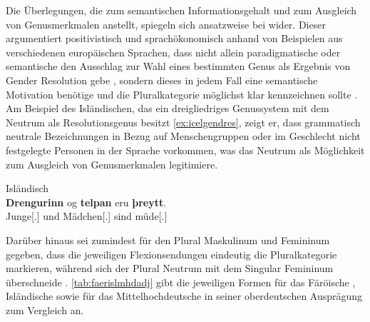 Die Überlegungen, die \citeauthor{askedal1973} zum semantischen
Informationsgehalt und zum Ausgleich von Genusmerkmalen anstellt, spiegeln sich
ansatzweise bei \citet{corbett1991} wider. Dieser argumentiert positivistisch
und sprachökonomisch anhand von Beispielen aus verschiedenen europäischen
Sprachen, dass nicht allein paradigmatische oder semantische
 den Ausschlag zur Wahl eines bestimmten Genus als Ergebnis
von Gender Resolution gebe \autocite[290--293]{corbett1991}, sondern dieses
 in jedem Fall eine semantische Motivation benötige und
die Plural\-kategorie möglichst klar kennzeichnen sollte
\autocite[293--299]{corbett1991}. Am Beispiel des Isländischen, das ein
dreigliedriges Genussystem mit dem Neutrum als Resolutionsgenus besitzt
\cref{ex:icelgendres}, zeigt er, dass grammatisch neutrale Bezeichnungen in
Bezug auf Menschen\-gruppen oder im Geschlecht nicht festgelegte Personen in
der Sprache vorkommen, was das Neutrum als Möglichkeit zum Ausgleich von
Genusmerkmalen legiti\-miere.

\begin{exe}
\ex \label{ex:icelgendres}
	Isländisch \parencites[nach][283]{corbett1991}[569]{wechsler2009}\\
	\gll \textbf{Drengurinn} og \textbf{telpan} eru \textbf{þreytt}. \\
		Junge[\M.\Sg] und Mädchen[\F.\Sg] sind müde[\N.\Pl] \\
	\trans {}
\end{exe}

Darüber hinaus sei zumindest für den Plural Maskulinum und Femininum gegeben,
dass die jeweiligen Flexions\-endungen eindeutig die Pluralkategorie markieren,
während sich der Plural Neutrum mit dem Singular Femininum überschneide
\autocite[298--299]{corbett1991}. \cref{tab:faerislmhdadj} gibt die jeweiligen
Formen für das Färöische \autocite[100--101]{thrainsson2004}, Isländische
\autocite[84--90]{kress1982} sowie für
das Mittelhochdeutsche in seiner oberdeutschen Ausprägung \autocites[182]{ksw2}
zum Vergleich an.

